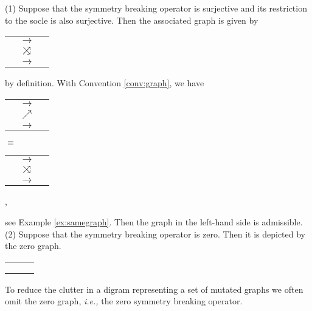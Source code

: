\begin{example}
\label{ex:SBOgraph}
{\rm{(1)}}\enspace
Suppose that the symmetry breaking operator is surjective and its restriction to the socle {\blueO} is also surjective. 
Then the associated graph is given by 
\begin{center}
\begin{tabular}{c@{\kern.7em}c@{\kern.7em}c} 
		\redO & $\rightarrow$ & \magentaO \\
		& $\nearrow\kern-1em\searrow$ & \\
		\blueO & $\rightarrow$ & \greenO
	\end{tabular}
\end{center}
by definition.  
With Convention \ref{conv:graph}, 
 we have 
\begin{center}
	\begin{tabular}{c@{\kern.7em}c@{\kern.7em}c} 
		\redO & $\rightarrow$ & \magentaO \\
		& $\nearrow$ & \\
		\blueO & $\rightarrow$ & \greenO
	\end{tabular}
$\equiv$
\begin{tabular}{c@{\kern.7em}c@{\kern.7em}c} 
		\redO & $\rightarrow$ & \magentaO \\
		& $\nearrow\kern-1em\searrow$ & \\
		\blueO & $\rightarrow$ & \greenO
	\end{tabular}, 
\end{center}
see Example \ref{ex:samegraph}.  
Then the graph in the left-hand side is admissible.  
\newline
{\rm{(2)}}\enspace
Suppose that the symmetry breaking operator is zero.  
Then it is depicted by the zero graph.  

\begin{center}
	\begin{tabular}{c@{\kern.7em}c@{\kern.7em}c} 
		\redO & & \magentaO \\
		& \phantom{$\rightarrow$} & \\
		\blueO & & \greenO
	\end{tabular}
\end{center}
\end{example}
To reduce the clutter in a digram representing a set of mutated graphs we often omit the zero graph, 
{\it{i.e.,}} the zero symmetry breaking operator. 

\medskip

